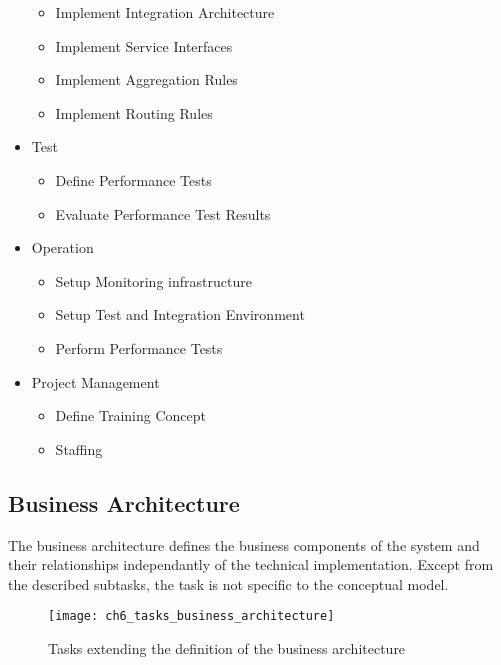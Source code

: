 \begin{itemize}
\begin{itemize}
\begin{itemize}
		\end{itemize}
		\item Implement Integration Architecture
		\item Implement Service Interfaces
		\item Implement Aggregation Rules 
		\item Implement Routing Rules
	\end{itemize}
	\item Test
	\begin{itemize}
		\item Define Performance Tests 
		\item Evaluate Performance Test Results
	\end{itemize}
	\item Operation
	\begin{itemize}
		\item Setup Monitoring infrastructure
		\item Setup Test and Integration Environment
		\item Perform Performance Tests
	\end{itemize} 
	\item Project Management
	\begin{itemize}
		\item Define Training Concept
		\item Staffing
	\end{itemize}
\end{itemize}

\subsection{Business Architecture}

The business architecture defines the business components of the system and their relationships independantly of the technical implementation.
Except from the described subtasks, the task is not specific to the conceptual model.

\begin{figure}[htpb] \centering 
	\texttt{[image: ch6\_tasks\_business\_architecture]} 
	\caption{Tasks extending the definition of the business architecture} 
	\label{fig:ch6_tasks_business_architecture} 
\end{figure}

